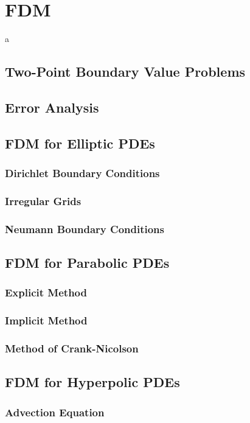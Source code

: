 \documentclass[
    final,
    a4paper,
    oneside,
    parskip=full,
    headings=standardclasses,
    headings=big,
    pointednumbers,
    fleqn,
    numbers=noenddot
]{scrartcl}
\begin{document}
    
    \section{FDM}
    a
    \subsection{Two-Point Boundary Value Problems}
    \subsection{Error Analysis}
    \subsection{FDM for Elliptic PDEs}
    \subsubsection{Dirichlet Boundary Conditions}
    \subsubsection{Irregular Grids}
    \subsubsection{Neumann Boundary Conditions}

    \subsection{FDM for Parabolic PDEs}
    \subsubsection{Explicit Method}
    \subsubsection{Implicit Method}
    \subsubsection{Method of Crank-Nicolson}

    \subsection{FDM for Hyperpolic PDEs}
    \subsubsection{Advection Equation}
\end{document}
